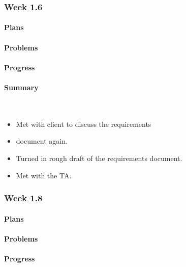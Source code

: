 \documentclass[onecolumn, draftclsnofoot,10pt, compsoc]{article}
\begin{document}
		\subsubsection{Week 1.6}
		
		    \paragraph{Plans} \hfill \break
		
		    \paragraph{Problems} \hfill \break

		    \paragraph{Progress} \hfill \break

		    \paragraph{Summary} \hfill \
		        \begin{itemize}
		            \item Met with client to discuss the requirements \item document again.
                    \item Turned in rough draft of the requirements document. 
                    \item Met with the TA. \\
                \end{itemize}

		
		\subsubsection{Week 1.8}
		
			\paragraph{Plans} \hfill \break
		
		    \paragraph{Problems} \hfill \break

		    \paragraph{Progress} \hfill \break
\end{document}
